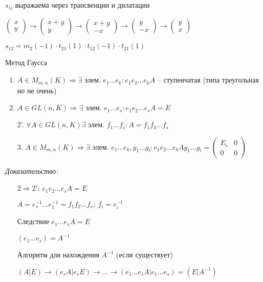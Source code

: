\documentclass[12pt]{article}
\begin{document}
\begin{propos}{}
    $s_{ij}$ выражаема через трансвенции и дилатации

    $\begin{pmatrix}
        x \\
        y
    \end{pmatrix} \to \begin{pmatrix}
        x + y \\
        y
    \end{pmatrix} \to \begin{pmatrix}
        x + y \\
        -x 
    \end{pmatrix} \to \begin{pmatrix}
        y \\
        -x
    \end{pmatrix} \to \begin{pmatrix}
        y \\
        x 
    \end{pmatrix}$

    $s_{12} = m_2(-1) \cdot t_{21}(1) \cdot t_{12}(-1) \cdot t_{21}(1)$
\end{propos}

\begin{theo}{Метод Гаусса}
    \begin{enumerate}
        \item $A \in M_{m, n}(K) \Rightarrow \exists \text{ элем. } e_1 \ldots e_k : e_1e_2 \ldots e_kA$ -- ступенчатая (типа треугольная но не очень)
        \item $A \in GL(n, K) \Rightarrow \exists \text{ элем. } e_1 \ldots e_s : e_1e_2 \ldots e_sA = E$
        \item[2'.] $\forall A \in GL(n, K) \exists \text{ элем. } f_1 \ldots f_s : A = f_1f_2 \ldots f_s$
        \item[3.] $A \in M_{m, n}(K) \Rightarrow \exists \text{ элем. } e_1 \ldots e_k, g_1 \ldots g_l : e_1e_2 \ldots e_kAg_1 \ldots g_l = \begin{pmatrix}
            E_r & 0 \\
            0 & 0
        \end{pmatrix}$
    \end{enumerate}
\end{theo}

\textit{Доказательство:}

\begin{itemize}
    \item[$2 \Rightarrow 2'$:] $e_1e_2 \ldots e_sA = E$
    
    $A = e_s^{-1} \ldots e_1^{-1} = f_1f_2 \ldots f_s;\ f_i = e_i^{-1}$

    \begin{theo}{Следствие}
        $e_1 \ldots e_sA = E$

        $(e_1 \ldots e_s) = A^{-1}$

        Алгоритм для нахождения $A^{-1}$ (если существует)

        $(A | E) \to (e_sA | e_sE) \to \ldots \to (e_1 \ldots e_sA | e_1 \ldots e_s) = (E | A^{-1})$
    \end{theo}
\end{itemize}
\end{document}
